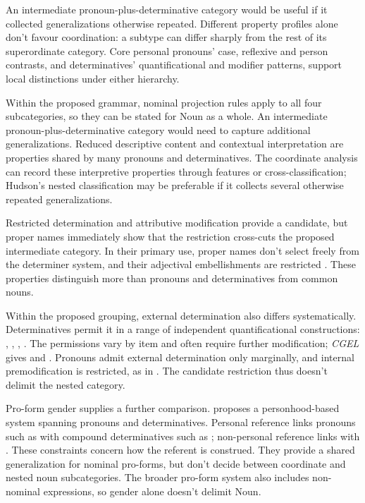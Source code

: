 \documentclass[12pt]{article}
\begin{document}
An intermediate pronoun-plus-determinative category would be useful if it collected generalizations otherwise repeated. Different property profiles alone don't favour coordination: a subtype can differ sharply from the rest of its superordinate category. Core personal pronouns' case, reflexive and person contrasts, and determinatives' quantificational and modifier patterns, support local distinctions under either hierarchy.

Within the proposed grammar, nominal projection rules apply to all four subcategories, so they can be stated for Noun as a whole. An intermediate pronoun-plus-determinative category would need to capture additional generalizations. Reduced descriptive content and contextual interpretation are properties shared by many pronouns and determinatives. The coordinate analysis can record these interpretive properties through features or cross-classification; Hudson's nested classification may be preferable if it collects several otherwise repeated generalizations.

Restricted determination and attributive modification provide a candidate, but proper names immediately show that the restriction cross-cuts the proposed intermediate category. In their primary use, proper names don't select freely from the determiner system, and their adjectival embellishments are restricted \citep[517, 519--520]{huddleston2002}. These properties distinguish more than pronouns and determinatives from common nouns.

Within the proposed grouping, external determination also differs systematically. Determinatives permit it in a range of independent quantificational constructions: , , , . The permissions vary by item and often require further modification; \textit{CGEL} gives  and  \citep[415--416]{huddleston2002}. Pronouns admit external determination only marginally, and internal premodification is restricted, as in  \citep[429--430]{huddleston2002}. The candidate restriction thus doesn't delimit the nested category.

Pro-form gender supplies a further comparison. \textcite{reynolds2025proformgender} proposes a personhood-based system spanning pronouns and determinatives. Personal reference links pronouns such as  with compound determinatives such as ; non-personal reference links  with . These constraints concern how the referent is construed. They provide a shared generalization for nominal pro-forms, but don't decide between coordinate and nested noun subcategories. The broader pro-form system also includes non-nominal expressions, so gender alone doesn't delimit Noun.
\end{document}
